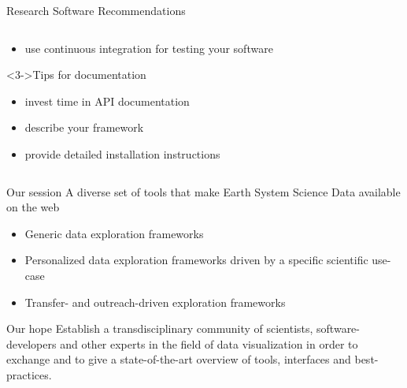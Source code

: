 \begin{frame}{Research Software Recommendations}
\begin{columns}[t]
\begin{column}{0.5\textwidth}
\begin{block}
\begin{itemize}
                    \item use continuous integration for testing your software
                \end{itemize}
            \end{block}
            \begin{block}<3->{Tips for documentation}
                \begin{itemize}
                    \item invest time in API documentation
                    \item describe your framework
                    \item provide detailed installation instructions
                \end{itemize}
            \end{block}
        \end{column}
    \end{columns}

\end{frame}

\begin{frame}[t]{Our session}
    A diverse set of tools that make Earth System Science Data available on the
    web

    \vspace{1em}

    \begin{itemize}
        \item Generic data exploration frameworks
        \item Personalized data exploration frameworks driven by a specific
            scientific use-case
        \item Transfer- and outreach-driven exploration frameworks
    \end{itemize}

    \vspace{1em}

    \begin{block}{Our hope}
        Establish a transdisciplinary community of scientists,
        software-developers and other experts in the field of data
        visualization in order to exchange and to give a state-of-the-art
        overview of tools, interfaces and best-practices.
    \end{block}
\end{frame}
